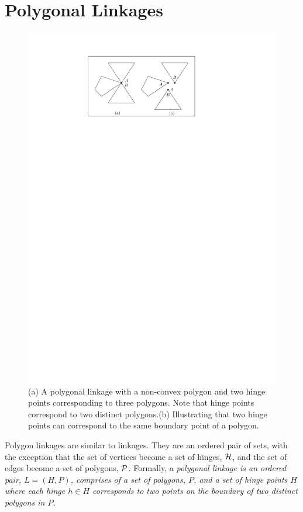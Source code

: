 \section{Polygonal Linkages}
\begin{figure}[h]
\begin{center}
\includegraphics[scale=1]{graphics/hingeOnThreeDistinctPolygons.pdf}
\end{center} 
\caption{(a) A polygonal linkage with a non-convex polygon and two hinge points corresponding to 
three polygons.  Note that hinge points correspond to two distinct polygons.(b) Illustrating that 
two hinge points can correspond to the same boundary point of a polygon.}
\label{fig:linkage-1}
\end{figure}
Polygon linkages are similar to linkages.  They are an ordered pair of sets, with the exception 
that the set of vertices become a set of hinges, ${\cal H}$, and the set of edges become a set of 
polygons, ${\cal P}$.  Formally, a \it{polygonal linkage} is an ordered pair, $L = (H,P)$,  comprises of 
a set of polygons, $P$, and a set of hinge points $H$ where each hinge $h \in H$ corresponds to two 
points on the boundary of two distinct polygons in $P$. 

